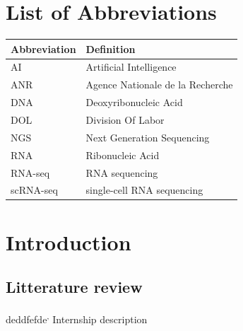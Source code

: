 \documentclass[
  11pt,
  a4paper,
]{report}
\renewcommand*\listfigurename{List of Figures}
\newcommand\listfigurename{List of Figures}
\renewcommand*\listtablename{List of Tables}
\newcommand\listtablename{List of Tables}
\begin{document}

\chapter*{List of Abbreviations}\label{list-of-abbreviations}


\begin{longtable}[]{@{}ll@{}}
\toprule\noalign{}
Abbreviation & Definition \\
\midrule\noalign{}
\endhead
\bottomrule\noalign{}
\endlastfoot
AI & Artificial Intelligence \\
ANR & Agence Nationale de la Recherche \\
DNA & Deoxyribonucleic Acid \\
DOL & Division Of Labor \\
NGS & Next Generation Sequencing \\
RNA & Ribonucleic Acid \\
RNA-seq & RNA sequencing \\
scRNA-seq & single-cell RNA sequencing \\
\end{longtable}

\renewcommand{\listfigurename}{List of Figures}
\renewcommand{\listtablename}{List of Tables}

\clearpage
{}
\listoffigures

\clearpage
{}
\listoftables

\clearpage{}\setcounter{page}{1}


\chapter{Introduction}\label{sec-intro}

\section{Litterature review}\label{litterature-review}

deddfefde\textsuperscript{,}
Internship description
\end{document}
